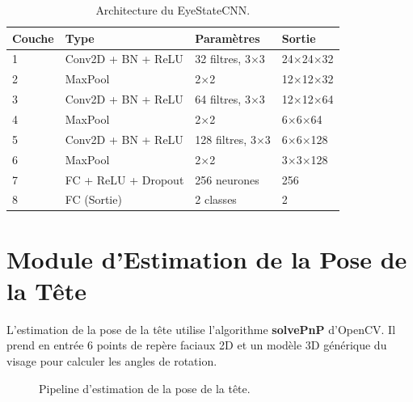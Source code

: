 \documentclass[12pt,a4paper]{report}
\begin{document}
\begin{table}[H]
    \centering
    \caption{Architecture du EyeStateCNN.}
    \label{tab:eye_cnn}
    \begin{tabular}{llll}
        \toprule
        \textbf{Couche} & \textbf{Type} & \textbf{Paramètres} & \textbf{Sortie} \\
        \midrule
        1 & Conv2D + BN + ReLU & 32 filtres, 3$\times$3 & 24$\times$24$\times$32 \\
        2 & MaxPool & 2$\times$2 & 12$\times$12$\times$32 \\
        3 & Conv2D + BN + ReLU & 64 filtres, 3$\times$3 & 12$\times$12$\times$64 \\
        4 & MaxPool & 2$\times$2 & 6$\times$6$\times$64 \\
        5 & Conv2D + BN + ReLU & 128 filtres, 3$\times$3 & 6$\times$6$\times$128 \\
        6 & MaxPool & 2$\times$2 & 3$\times$3$\times$128 \\
        7 & FC + ReLU + Dropout & 256 neurones & 256 \\
        8 & FC (Sortie) & 2 classes & 2 \\
        \bottomrule
    \end{tabular}
\end{table}

\section{Module d'Estimation de la Pose de la Tête}

L'estimation de la pose de la tête utilise l'algorithme \textbf{solvePnP} d'OpenCV. Il prend en entrée 6 points de repère faciaux 2D et un modèle 3D générique du visage pour calculer les angles de rotation.

\begin{figure}[H]
    \centering
    \caption{Pipeline d'estimation de la pose de la tête.}
    \label{fig:head_pose}
\end{figure}
\end{document}
